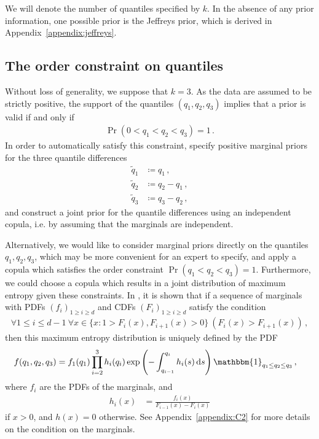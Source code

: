 \documentclass{article}
\newcommand{\dd}{{\rm d}}
\begin{document}
%
We will denote the number of quantiles specified by $k$.
In the absence of any prior information,
one possible prior is the Jeffreys prior, which is derived in
Appendix~\ref{appendix:jeffreys}.
%
\subsection{The order constraint on quantiles}
\label{section:order}
%
Without loss of generality, we suppose that $k = 3$.
As the data are assumed to be strictly positive,
the support of the quantiles $(q_1, q_2, q_3)$
implies that a prior is valid if and only if
%
\begin{align*}
	\Pr(0 < q_1 < q_2 < q_3) = 1 \,.
\end{align*}
%
In order to automatically satisfy this constraint,
\cite{coles1996} specify positive marginal priors
for the three quantile differences
%
\begin{align*}
	\tilde{q}_1 &\coloneqq q_1 \,,\\
	\tilde{q}_2 &\coloneqq q_2 - q_1 \,,\\
	\tilde{q}_3 &\coloneqq q_3 - q_2 \,,
\end{align*}
%
and construct a joint prior for the quantile differences
using an independent copula, i.e.
by assuming that the marginals are independent.
%

%
Alternatively, we would like to consider
marginal priors directly on the quantiles
$q_1, q_2, q_3$, which may be more convenient for an expert to specify,
and apply a copula which satisfies the order constraint
$\Pr(q_1 < q_2 < q_3) = 1$. 
Furthermore, we could choose a copula
which results in a joint distribution
of maximum entropy given these constraints.
In \cite{butucea2018}, it is shown that
if a sequence of marginals with PDFs $(f_i)_{1 \geq i \geq d}$
and CDFs $(F_i)_{1 \geq i \geq d}$
satisfy the condition
%
\begin{align}
	\forall 1 \leq i \leq d - 1
		\ \forall x \in \{x \colon 1 > F_i(x), F_{i + 1}(x) > 0\}
		\ (F_i(x) > F_{i + 1}(x))\,,
	\label{eq:C2}
\end{align}
%
then this maximum entropy distribution is uniquely defined
by the PDF
%
\begin{align}
	f(q_1, q_2, q_3) &= f_1(q_1) \prod_{i=2}^3 h_i(q_i)
		\exp\left(-\int_{q_{i - 1}}^{q_i} h_i(s) \, \dd s\right)
		\mathbbm{1}_{q_1 \leq q_2 \leq q_3} \,,
	\label{eq:max-ent-pdf}
\end{align}
%
where $f_i$ are the PDFs of the marginals, and
%
\begin{align*}
	h_i(x) &= \frac{f_i(x)}{F_{i - 1}(x) - F_i(x)}
\end{align*}
%
if $x > 0$, and $h(x) = 0$ otherwise.
See Appendix~\ref{appendix:C2} for more details
on the condition on the marginals.
\end{document}

